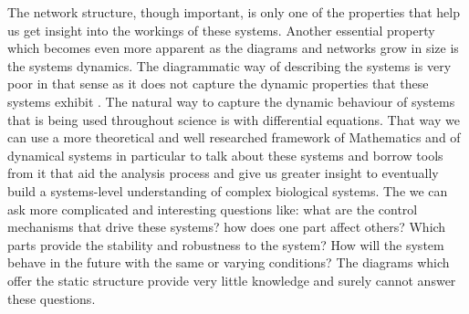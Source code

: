 The network structure, though important, is only one of the properties that help us get insight into the workings of these systems. Another essential property which becomes even more apparent as the diagrams and networks grow in size is the systems dynamics. The diagrammatic way of describing the systems is very poor in that sense as it does not capture the dynamic properties that these systems exhibit \cite[] {kitano2002computational}. The natural way to capture the dynamic behaviour of systems that is being used throughout science is with differential equations. That way we can use a more theoretical and well researched framework of Mathematics and of dynamical systems in particular  to talk about these systems and borrow tools from it that aid the analysis process and give us greater insight to eventually build a systems-level understanding of complex biological systems. %
The we can ask more complicated and interesting questions like: what are the control mechanisms that drive these systems? how does one part affect others? Which parts provide the stability and robustness to the system? How will the system behave in the future with the same or varying conditions? The diagrams which offer the static structure provide very little knowledge and surely cannot answer these questions.

